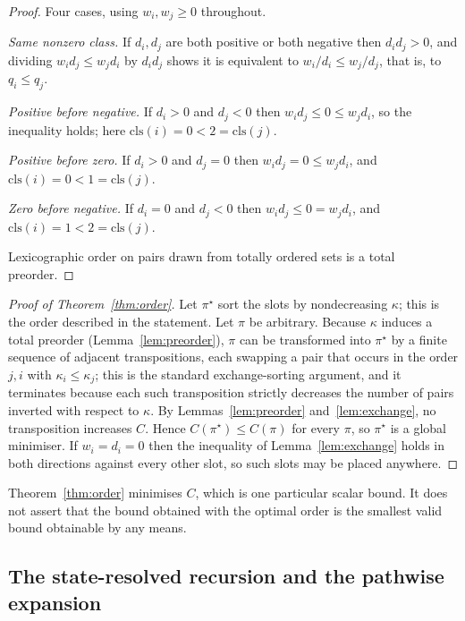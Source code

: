 \begin{proof}
Four cases, using $w_i,w_j\ge0$ throughout.

\emph{Same nonzero class.} If $d_i,d_j$ are both positive or both negative then
$d_id_j>0$, and dividing $w_id_j\le w_jd_i$ by $d_id_j$ shows it is equivalent to
$w_i/d_i\le w_j/d_j$, that is, to $q_i\le q_j$.

\emph{Positive before negative.} If $d_i>0$ and $d_j<0$ then $w_id_j\le0\le w_jd_i$, so
the inequality holds; here $\mathrm{cls}(i)=0<2=\mathrm{cls}(j)$.

\emph{Positive before zero.} If $d_i>0$ and $d_j=0$ then $w_id_j=0\le w_jd_i$, and
$\mathrm{cls}(i)=0<1=\mathrm{cls}(j)$.

\emph{Zero before negative.} If $d_i=0$ and $d_j<0$ then $w_id_j\le0=w_jd_i$, and
$\mathrm{cls}(i)=1<2=\mathrm{cls}(j)$.

Lexicographic order on pairs drawn from totally ordered sets is a total preorder.
\end{proof}

\begin{proof}[Proof of Theorem~\ref{thm:order}]
Let $\pi^\star$ sort the slots by nondecreasing $\kappa$; this is the order described in
the statement. Let $\pi$ be arbitrary. Because $\kappa$ induces a total preorder
(Lemma~\ref{lem:preorder}), $\pi$ can be transformed into $\pi^\star$ by a finite sequence
of adjacent transpositions, each swapping a pair that occurs in the order $j,i$ with
$\kappa_i\le\kappa_j$; this is the standard exchange-sorting argument, and it terminates
because each such transposition strictly decreases the number of pairs inverted with
respect to $\kappa$. By Lemmas~\ref{lem:preorder} and~\ref{lem:exchange}, no transposition
increases $C$. Hence $C(\pi^\star)\le C(\pi)$ for every $\pi$, so $\pi^\star$ is a global
minimiser. If $w_i=d_i=0$ then the inequality of Lemma~\ref{lem:exchange} holds in both
directions against every other slot, so such slots may be placed anywhere.
\end{proof}

\begin{remark}
\label{rem:orderfamily}
Theorem~\ref{thm:order} minimises $C$, which is one particular scalar bound. It does not
assert that the bound obtained with the optimal order is the smallest valid bound
obtainable by any means.
\end{remark}

\subsection{The state-resolved recursion and the pathwise expansion}

